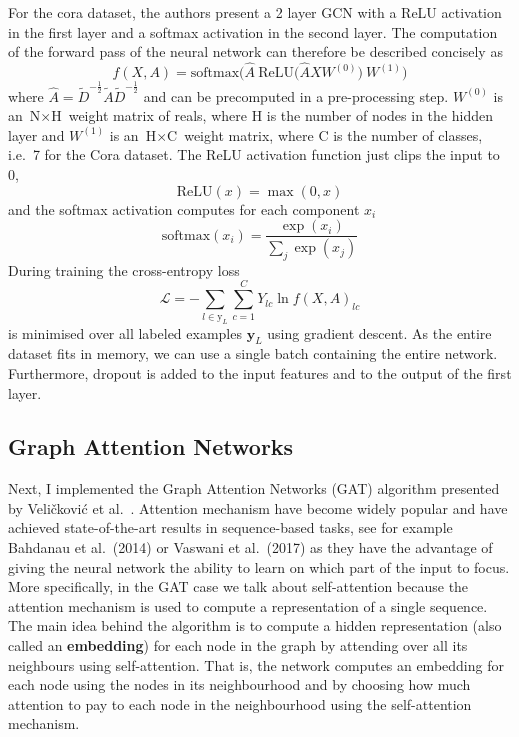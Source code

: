 \documentclass[12pt]{article}
\theoremstyle{definition}
\begin{document}
For the cora dataset, the authors present a 2 layer GCN with a ReLU activation in the first layer and a softmax activation in the second layer. The computation of the forward pass of the neural network can therefore be described concisely as
\[
f(X,A) = \textrm{softmax}\big(\hat{A}\ \textrm{ReLU}\big( \hat{A} X W^{(0)} \big)\ W^{(1)} \big)
\]
where $\hat{A} = \tilde{D}^{-\frac{1}{2}} \tilde{A} \tilde{D}^{-\frac{1}{2}}$ and can be precomputed in a pre-processing step. $W^{(0)}$ is an $\textrm{N} \times \textrm{H}$ weight matrix of reals, where H is the number of nodes in the hidden layer and $W^{(1)}$ is an $\textrm{H} \times \textrm{C}$ weight matrix, where C is the number of classes, i.e.\ 7  for the Cora dataset. The ReLU activation function just clips the input to 0,
\[
\textrm{ReLU}(x) = \max(0, x)
\]
and the softmax activation computes for each component $x_i$
\[
\textrm{softmax}(x_i) = \frac{\exp(x_i)}{\sum_j \exp(x_j)}
\]
During training the cross-entropy loss 
\[
\mathcal{L} = - \sum_{l \in \textrm{y}_L} \sum_{c=1}^{C} Y_{lc} \ln f(X,A)_{lc}
\]
is minimised over all labeled examples $\textbf{y}_L$ using gradient descent. As the entire dataset fits in memory, we can use a single batch containing the entire network. Furthermore, dropout \cite{srivastava2014dropout} is added to the input features and to the output of the first layer.

\subsection{Graph Attention Networks}
Next, I implemented the Graph Attention Networks (GAT) algorithm presented by Veli{\v{c}}kovi{\'{c}} et al.\ \cite{velickovic2018graph}. Attention mechanism have become widely popular and have achieved state-of-the-art results in sequence-based tasks, see for example Bahdanau et al.\ (2014) \cite{bahdanau2014neural} or Vaswani et al.\ (2017) \cite{vaswani2017attention} as they have the advantage of giving the neural network the ability to learn on which part of the input to focus. More specifically, in the GAT case we talk about self-attention because the attention mechanism is used to compute a representation of a single sequence. The main idea behind the algorithm is to compute a hidden representation (also called an \textbf{embedding}) for each node in the graph by attending over all its neighbours using self-attention. That is, the network computes an embedding for each node using the nodes in its neighbourhood and by choosing how much attention to pay to each node in the neighbourhood using the self-attention mechanism.
\bigskip
\end{document}
